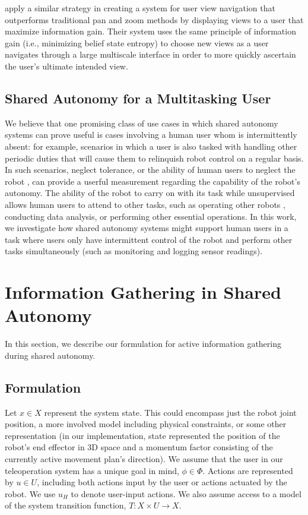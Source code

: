 \documentclass[conference]{IEEEtran}
\begin{document}
\citet{liu2017bignav} apply a similar strategy in creating a system for user view navigation that outperforms traditional pan and zoom methods by displaying views to a user that maximize information gain. Their system uses the same principle of information gain (i.e., minimizing belief state entropy) to choose new views as a user navigates through a large multiscale interface in order to more quickly ascertain the user's ultimate intended view.

\subsection{Shared Autonomy for a Multitasking User}
We believe that one promising class of use cases in which shared autonomy systems can prove useful is cases involving a human user whom is intermittently absent: for example, scenarios in which a user is also tasked with handling other periodic duties that will cause them to relinquish robot control on a regular basis. In such scenarios, neglect tolerance, or the ability of human users to neglect the robot \cite{crandall2002characterizing, olsen2003metrics}, can provide a userful measurement regarding the capability of the robot's autonomy. The ability of the robot to carry on with its task while unsupervised allows human users to attend to other tasks, such as operating other robots \cite{crandall2005validating, cummings2008predicting}, conducting data analysis, or performing other essential operations. In this work, we investigate how shared autonomy systems might support human users in a task where users only have intermittent control of the robot and perform other tasks simultaneously (such as monitoring and logging sensor readings). 

\section{Information Gathering in Shared Autonomy}\label{formulation}

In this section, we describe our formulation for active information gathering during shared autonomy.

\subsection{Formulation}

Let $ x \in X $ represent the system state. This could encompass just the robot joint position, a more involved model including physical constraints, or some other representation (in our implementation, state represented the position of the robot's end effector in 3D space and a momentum factor consisting of the currently active movement plan's direction). We assume that the user in our teleoperation system has a unique goal in mind, $\phi \in \Phi$. Actions are represented by $ u \in U $, including both actions input by the user or actions actuated by the robot. We use $u_H$ to denote user-input actions. We also assume access to a model of the system transition function, $T: X \times U \rightarrow X$.
\end{document}
